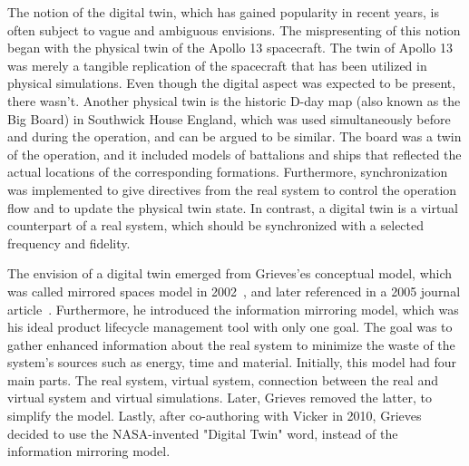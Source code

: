 \documentclass{llncs}
\begin{document}
    The notion of the digital twin, which has gained popularity in 
    recent years, is often subject to vague and ambiguous envisions\cite{Review1}.
    The mispresenting of this notion began with the physical twin of the Apollo 13 spacecraft. 
    The twin of Apollo 13 was merely a tangible replication of the spacecraft that has been utilized in physical simulations. 
    Even though the digital aspect was expected to be present, there wasn't\cite{GrievesApollo13}.
    Another physical twin is the historic D-day map (also known as the Big Board) in Southwick House England, 
    which was used simultaneously before and during the operation, and can be argued to be similar. 
    The board was a twin of the operation, and it included models of battalions and ships that reflected the actual 
    locations of the corresponding formations. Furthermore, synchronization was 
    implemented to give directives from the real system to control the operation 
    flow and to update the physical twin state\cite{AMRC}.
    In contrast, a digital twin is a virtual counterpart of a real system, which should 
    be synchronized with a selected frequency and fidelity\cite{Review1,Review2,digitaltwinconsortium2022}.
    
    The envision of a digital twin emerged from Grieves'es conceptual model, which was called mirrored spaces model in 2002~\cite{Originsofdigitaltwinconcept},
    and later referenced in a 2005 journal article~\cite{2005JournayArticle}. 
    Furthermore, he introduced the information mirroring model, which was his ideal product lifecycle management tool with only one goal. 
    The goal was to gather enhanced information about the real system to minimize the waste of the system's sources such as energy, 
    time and material. Initially, this model had four main parts. The real system, 
    virtual system, connection between the real and virtual system and virtual simulations\cite{GrievesPLMBook}. 
    Later, Grieves removed the latter, to simplify the model\cite{Originsofdigitaltwinconcept}. Lastly, after co-authoring with Vicker in 2010, 
    Grieves decided to use the NASA-invented "Digital Twin" word, instead of the information mirroring model\cite{Originsofdigitaltwinconcept}.
     
\end{document}
